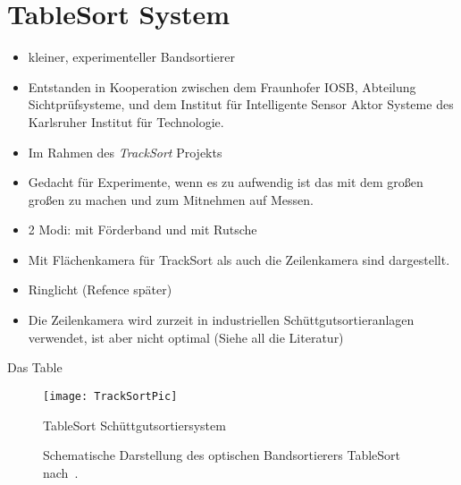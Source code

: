 \section{TableSort System}


\begin{itemize}
	\item kleiner, experimenteller Bandsortierer~\cite{doll2015}
	\item Entstanden in Kooperation zwischen dem Fraunhofer IOSB, Abteilung Sichtprüfsysteme, und dem Institut für Intelligente Sensor Aktor Systeme des Karlsruher Institut für Technologie.
	\item Im Rahmen des \textit{TrackSort} Projekts
	\item Gedacht für Experimente, wenn es zu aufwendig ist das mit dem großen großen zu machen und zum Mitnehmen auf Messen.
	\item 2 Modi: mit Förderband und mit Rutsche
	\item Mit Flächenkamera für TrackSort als auch die Zeilenkamera sind dargestellt.
	\item Ringlicht (Refence später)
	\item Die Zeilenkamera wird zurzeit in industriellen Schüttgutsortieranlagen verwendet, ist aber nicht optimal (Siehe all die Literatur)
\end{itemize}

Das Table

\begin{figure}[h]
	\texttt{[image: TrackSortPic]}
	\caption{TableSort Schüttgutsortiersystem \cite{fraunhoferiosb2017}}
	\label{fig:tablesortsystem}
\end{figure}


\begin{figure}[h]
    \centering
    \def\svgwidth{\columnwidth}
	
	\label{fig:aufbau_tablesort}
	\caption{Schematische Darstellung des optischen Bandsortierers TableSort nach~\cite{Pfaff2017}.}
\end{figure}



